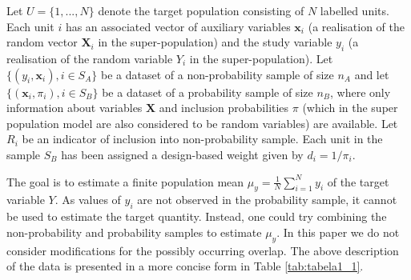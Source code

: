 \documentclass[
]{jss}
\begin{document}
Let \(U=\{1,..., N\}\) denote the target population consisting of \(N\)
labelled units. Each unit \(i\) has an associated vector of auxiliary
variables \(\boldsymbol{x}_{i}\) (a realisation of the random vector
\(\boldsymbol{X}_{i}\) in the super-population) and the study variable
\(y_{i}\) (a realisation of the random variable \(Y_{i}\) in the
super-population). Let \(\{ (y_i, \boldsymbol{x}_i), i \in S_A\}\) be a
dataset of a non-probability sample of size \(n_A\) and let
\(\{\left(\boldsymbol{x}_i, \pi_{i}\right), i \in S_B\}\) be a dataset
of a probability sample of size \(n_B\), where only information about
variables \(\boldsymbol{X}\) and inclusion probabilities \(\pi\) (which
in the super population model are also considered to be random
variables) are available. Let \(R_i\) be an indicator of inclusion into
non-probability sample. Each unit in the sample \(S_B\) has been
assigned a design-based weight given by \(d_i = 1/\pi_i\).

The goal is to estimate a finite population mean
\(\displaystyle\mu_{y}=\frac{1}{N}\sum_{i=1}^{N} y_{i}\) of the target
variable \(Y\). As values of \(y_{i}\) are not observed in the
probability sample, it cannot be used to estimate the target quantity.
Instead, one could try combining the non-probability and probability
samples to estimate \(\mu_{y}\). In this paper we do not consider
modifications for the possibly occurring overlap. The above description
of the data is presented in a more concise form in Table
\ref{tab:tabela1_1}.
\end{document}
